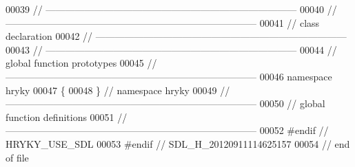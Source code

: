\begin{DoxyCode}
00039 \textcolor{comment}{//
      ------------------------------------------------------------------------------}
00040 \textcolor{comment}{//
      ------------------------------------------------------------------------------}
00041 \textcolor{comment}{// class declaration}
00042 \textcolor{comment}{//
      ------------------------------------------------------------------------------}
00043 \textcolor{comment}{//
      ------------------------------------------------------------------------------}
00044 \textcolor{comment}{// global function prototypes}
00045 \textcolor{comment}{//
      ------------------------------------------------------------------------------}
00046 \textcolor{keyword}{namespace }hryky
00047 \{
00048 \} \textcolor{comment}{// namespace hryky}
00049 \textcolor{comment}{//
      ------------------------------------------------------------------------------}
00050 \textcolor{comment}{// global function definitions}
00051 \textcolor{comment}{//
      ------------------------------------------------------------------------------}
00052 \textcolor{preprocessor}{#endif // HRYKY\_USE\_SDL}
00053 \textcolor{preprocessor}{}\textcolor{preprocessor}{#endif // SDL\_H\_20120911114625157}
00054 \textcolor{preprocessor}{}\textcolor{comment}{// end of file}
\end{DoxyCode}
